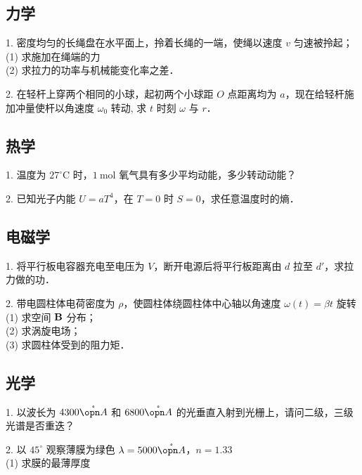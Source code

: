 
\subsection{力学}
1. 密度均匀的长绳盘在水平面上，拎着长绳的一端，使绳以速度 $v$ 匀速被拎起；\\
(1) 求施加在绳端的力\\
(2) 求拉力的功率与机械能变化率之差．

2. 在轻杆上穿两个相同的小球，起初两个小球距 $O$ 点距离均为 $a$，现在给轻杆施加冲量使杆以角速度 $\omega_{0}$ 转动, 求 $t$ 时刻 $\omega$ 与 $r$．
\subsection{热学}
1. 温度为 $27^{\circ} \mathrm{C}$ 时，$1 \mathrm{~mol}$ 氧气具有多少平均动能，多少转动动能？

2. 已知光子内能 $U=a T^{4}$，在 $T=0$ 时 $S=0$，求任意温度时的熵．
\subsection{电磁学}
1. 将平行板电容器充电至电压为 $V$，断开电源后将平行板距离由 $d$ 拉至 $d'$，求拉力做的功．

2. 带电圆柱体电荷密度为 $\rho$，使圆柱体绕圆柱体中心轴以角速度 $\omega(t)=\beta t$ 旋转\\
(1) 求空间 $\bf{B}$ 分布；\\
(2) 求涡旋电场；\\
(3) 求圆柱体受到的阻力矩．
\subsection{光学}
1. 以波长为 $4300 \mathring{\opn A}$ 和 $6800 \mathring{\opn A}$ 的光垂直入射到光栅上，请问二级，三级光谱是否重迭？

2. 以 $45^{\circ}$ 观察薄膜为绿色 $\lambda=5000 \mathring{\opn A}$，$n=1.33$\\
(1) 求膜的最薄厚度